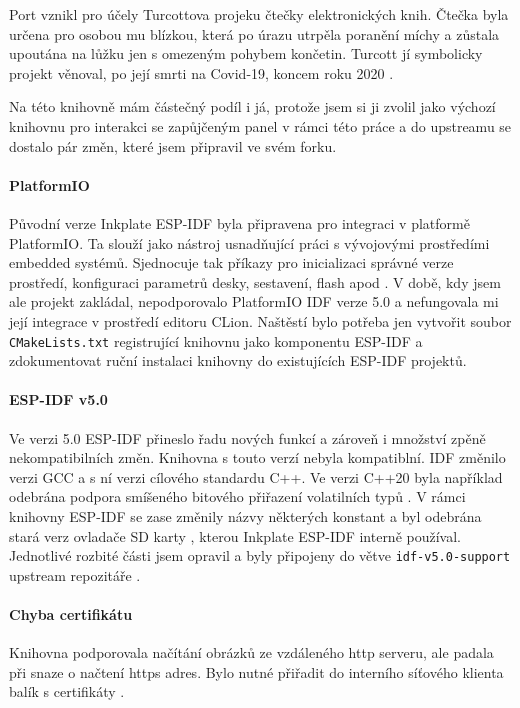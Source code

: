 Port vznikl pro účely Turcottova projeku čtečky elektronických knih. Čtečka byla určena pro osobou mu blízkou, která po úrazu utrpěla poranění míchy a zůstala upoutána na lůžku jen s omezeným pohybem končetin. Turcott jí symbolicky projekt věnoval, po její smrti na Covid-19, koncem roku 2020 \cite{turcotteTurgu1EPubInkPlate2024}.

Na této knihovně mám částečný podíl i já, protože jsem si ji zvolil jako výchozí knihovnu pro interakci se zapůjčeným panel v rámci této práce a do upstreamu se dostalo pár změn, které jsem připravil ve svém forku. 

\paragraph{PlatformIO} Původní verze Inkplate ESP-IDF byla připravena pro integraci v platformě PlatformIO. Ta slouží jako nástroj usnadňující práci s vývojovými prostředími embedded systémů. Sjednocuje tak příkazy pro inicializaci správné verze prostředí, konfiguraci parametrů desky, sestavení, flash apod \cite{WhatPlatformIOPlatformIO}. V době, kdy jsem ale projekt zakládal, nepodporovalo PlatformIO IDF verze 5.0 a nefungovala mi její integrace v prostředí editoru CLion. Naštěstí bylo potřeba jen vytvořit soubor \lstinline|CMakeLists.txt| registrující knihovnu jako komponentu ESP-IDF a zdokumentovat ruční instalaci knihovny do existujících ESP-IDF projektů.

\paragraph{ESP-IDF v5.0} Ve verzi 5.0 ESP-IDF přineslo řadu nových funkcí a zároveň i množství zpěně nekompatibilních změn. Knihovna s touto verzí nebyla kompatiblní. IDF změnilo verzi GCC a s ní verzi cílového standardu C++. Ve verzi C++20 byla například odebrána podpora smíšeného bitového přiřazení volatilních typů \cite{jtcDedeprecatingVolatileCompound}. V rámci knihovny ESP-IDF se zase změnily názvy některých konstant\cite{PeripheralsESP32S2ESPIDF} a byl odebrána stará verz ovladače SD karty \cite{StorageESP32S2ESPIDF}, kterou Inkplate ESP-IDF interně používal. Jednotlivé rozbité části jsem opravil a byly připojeny do větve \lstinline|idf-v5.0-support| upstream repozitáře \cite{WIPInitialSupport}. 

\paragraph{Chyba certifikátu} Knihovna podporovala načítání obrázků ze vzdáleného http serveru, ale padala při snaze o načtení https adres. Bylo nutné přiřadit do interního síťového klienta balík s certifikáty \cite{MenuconfigVariantSelection}.

